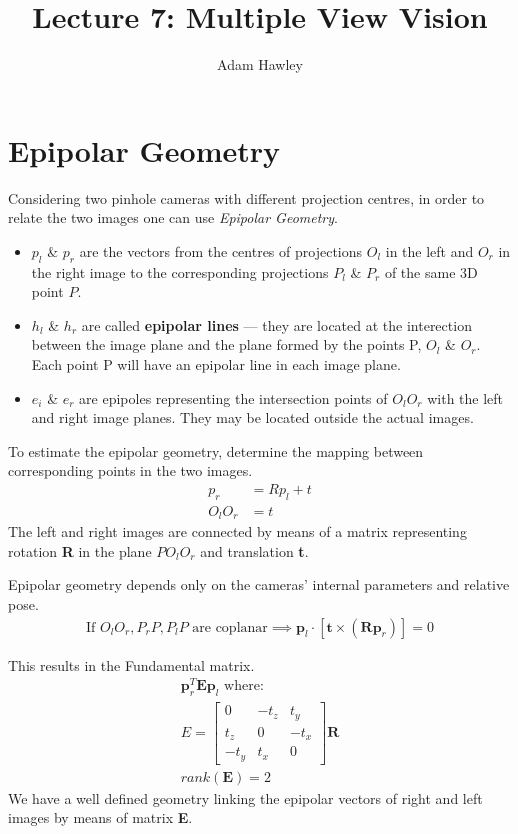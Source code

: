 \documentclass{article}
\author{Adam Hawley}
\title{Lecture 7: Multiple View Vision}
\begin{document}
\maketitle
\tableofcontents
\newpage

\section{Epipolar Geometry}
Considering two pinhole cameras with different projection centres, in order to relate the two images one can use {\it Epipolar Geometry}.

\begin{itemize}
	\item $p_l$ \& $p_r$ are the vectors from the centres of projections $O_l$ in the left and $O_r$ in the right image to the corresponding projections $P_l$ \& $P_r$ of the same 3D point $P$.
	\item $h_l$ \& $h_r$ are called {\bf epipolar lines} --- they are located at the interection between the image plane and the plane formed by the points P, $O_l$ \& $O_r$.
		Each point P will have an epipolar line in each image plane.
	\item $e_i$ \& $e_r$ are epipoles representing the intersection points of $O_l O_r$ with the left and right image planes.
		They may be located outside the actual images.
\end{itemize}


To estimate the epipolar geometry, determine the mapping between corresponding points in the two images.
\begin{align*}
	p_r &= Rp_l + t \\
	O_lO_r &= t
\end{align*}
The left and right images are connected by means of a matrix representing rotation {\bf R} in the plane $PO_lO_r$ and translation {\bf t}.  

Epipolar geometry depends only on the cameras' internal parameters and relative pose.
\begin{align*}
	\text{If } O_lO_r,P_rP,P_lP \text{ are coplanar} \implies \textbf{p}_l\cdot
	\left [\textbf{t} \times (\textbf{Rp}_r) \right ]
	= 0
\end{align*}

This results in the Fundamental matrix.
\begin{align*}
	\textbf{p}^T_r\textbf{Ep}_l \text{ where: }\\
	E = 
	\begin{bmatrix}
		0 & -t_z & t_y \\
		t_z & 0 & -t_x \\
		-t_y & t_x & 0
	\end{bmatrix}
	\textbf{R} \\
	rank(\textbf{E}) = 2
\end{align*}
We have a well defined geometry linking the epipolar vectors of right and left images by means of matrix \textbf{E}.
\end{document}
